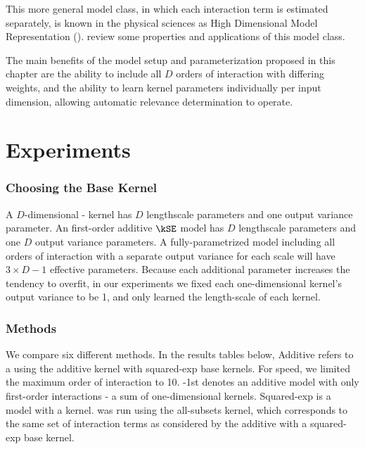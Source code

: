 This more general model class, in which each interaction term is estimated separately, is known in the physical sciences as High Dimensional Model Representation (\HDMR{}).
\citet{rabitz1999general} review some properties and applications of this model class.

The main benefits of the model setup and parameterization proposed in this chapter are the ability to include all $D$ orders of interaction with differing weights, and the ability to learn kernel parameters individually per input dimension, allowing automatic relevance determination to operate.



\section{Experiments}
\label{sec:additive-experiments}

\subsubsection{Choosing the Base Kernel}
A $D$-dimensional \kSE-\ARD{} kernel has $D$ lengthscale parameters and one output variance parameter.
An first-order additive $\kSE$ model has $D$ lengthscale parameters and one $D$ output variance parameters.
A fully-parametrized model including all orders of interaction with a separate output variance for each scale will have $3 \times D - 1$ effective parameters.
Because each additional parameter increases the tendency to overfit, %
%
%
in our experiments we fixed each one-dimensional kernel's output variance to be 1, and only learned the length-scale of each kernel.



\subsubsection{Methods}

We compare six different methods.
In the results tables below, \gp{} Additive refers to a \gp{} using the additive kernel with squared-exp base kernels.
For speed, we limited the maximum order of interaction to 10.
\gp{}-1st denotes an additive \gp{} model with only first-order interactions - a sum of one-dimensional kernels.
\gp{} Squared-exp is a \gp{} model with a \seard{} kernel.
\HKL{} was run using the all-subsets kernel, which corresponds to the same set of interaction terms as considered by the additive \gp{} with a squared-exp base kernel.


